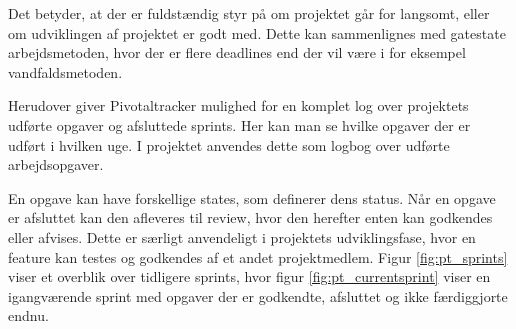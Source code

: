 Det betyder, at der er fuldstændig styr på om projektet går for langsomt, eller om udviklingen af projektet er godt med. Dette kan sammenlignes med gatestate arbejdsmetoden, hvor der er flere deadlines end der vil være i for eksempel vandfaldsmetoden.

Herudover giver Pivotaltracker mulighed for en komplet log over projektets udførte opgaver og afsluttede sprints. Her kan man se hvilke opgaver der er udført i hvilken uge. I projektet anvendes dette som logbog over udførte arbejdsopgaver.

En opgave kan have forskellige states, som definerer dens status. Når en opgave er afsluttet kan den afleveres til review, hvor den herefter enten kan godkendes eller afvises. Dette er særligt anvendeligt i projektets udviklingsfase, hvor en feature kan testes og godkendes af et andet projektmedlem. Figur \ref{fig:pt_sprints}  viser et overblik over tidligere sprints, hvor figur \ref{fig:pt_currentsprint} viser en igangværende sprint med opgaver der er godkendte, afsluttet og ikke færdiggjorte endnu.


